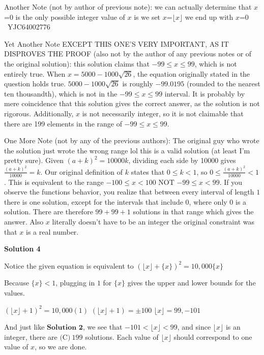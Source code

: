\begin{enumerate}
 
Another Note (not by author of previous note): we can actually determine that $x$=0 is the only possible integer value of $x$ is we set $x$=$\lfloor x \rfloor$ we end up with $x$=0   ~YJC64002776

 
Yet Another Note EXCEPT THIS ONE'S VERY IMPORTANT, AS IT DISPROVES THE PROOF (also not by the author of any previous notes or of the original solution): this solution claims that $-99 \leq x \leq 99$, which is not entirely true. When $x = 5000-1000\sqrt{26}$, the equation originally stated in the question holds true. $5000-1000\sqrt{26}$ is roughly $-99.0195$ (rounded to the nearest ten thousandth), which is not in the $-99 \leq x \leq 99$ interval. It is probably by mere coincidence that this solution gives the correct answer, as the solution is not rigorous. Additionally, $x$ is not necessarily integer, so it is not claimable that there are 199 elements in the range of $-99 \leq x \leq 99$.

 
One More Note (not by any of the previous authors): The original guy who wrote the solution just wrote the wrong range lol this is a valid solution (at least I'm pretty sure). Given $(a+k)^2 = 10000k$, dividing each side by 10000 gives $\frac{(a+k)^2}{10000} = k$. Our original definition of $k$ states that $0 \leq k < 1$, so $0 \leq \frac{(a+k)^2}{10000} < 1$. This is equivalent to the range $-100 \leq x < 100$ NOT $-99 \leq x < 99$. If you observe the functions behavior, you realize that between every interval of length $1$ there is one solution, except for the intervals that include $0$, where only $0$ is a solution. There are therefore $99+99+1$ solutions in that range which gives the answer. Also $x$ literally doesn't have to be an integer the original constraint was that $x$ is a real number.

 



\textbf{Solution 4}

Notice the given equation is equivalent to $(\lfloor x \rfloor+\{x\})^2=10,000\{x\}$

 Because $\{x\} < 1$, plugging in $1$ for $\{x\}$ gives the upper and lower bounds for the values.

 $(\lfloor x \rfloor +1)^2 = 10,000(1)$
$(\lfloor x \rfloor +1) = \pm 100$
$\lfloor x \rfloor = 99, -101$

 And just like $\textbf{Solution 2}$, we see that $-101 < \lfloor x \rfloor < 99$, and since $\lfloor x \rfloor$ is an integer, there are $\boxed{\text{(C)}~199}$ solutions. Each value of $\lfloor x \rfloor$ should correspond to one value of $x$, so we are done.


\end{enumerate}
